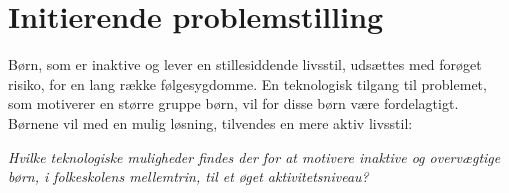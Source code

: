 \section{Initierende problemstilling}
Børn, som er inaktive og lever en stillesiddende livsstil, udsættes med forøget risiko, for en lang række følgesygdomme. En teknologisk tilgang til problemet, som motiverer en større gruppe børn, vil for disse børn være fordelagtigt. Børnene vil med en mulig løsning, tilvendes en mere aktiv livsstil: 

\begin{center}
\textit{Hvilke teknologiske muligheder findes der for at motivere inaktive og overvægtige børn, i folkeskolens mellemtrin, til et øget aktivitetsniveau?}
\end{center}